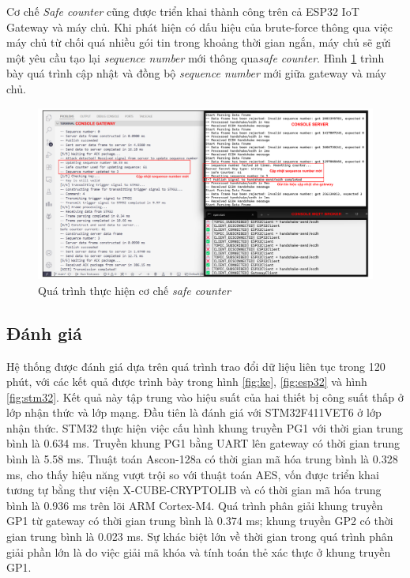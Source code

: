 Cơ chế \textit{Safe counter} cũng được triển khai thành công trên cả ESP32 IoT Gateway và máy chủ. Khi phát hiện có dấu hiệu của brute-force thông qua việc máy chủ từ chối quá nhiều gói tin trong khoảng thời gian ngắn, máy chủ sẽ gửi một yêu cầu tạo lại \textit{sequence number} mới thông qua\textit{safe counter}. Hình \ref{fig:sclog} trình bày quá trình cập nhật và đồng bộ \textit{sequence number} mới giữa gateway và máy chủ.

\begin{figure}[h]
    \centering
    \hspace*{-0.7cm}
    \includegraphics[width=1.08\linewidth]{sclog.pdf}
    \caption{Quá trình thực hiện cơ chế \textit{safe counter}}
    \label{fig:sclog}
\end{figure}

\subsection{Đánh giá}
\label{sec:res}
Hệ thống được đánh giá dựa trên quá trình trao đổi dữ liệu liên tục trong 120 phút, với các kết quả được trình bày trong hình \ref{fig:ke}, \ref{fig:esp32} và hình \ref{fig:stm32}. Kết quả này tập trung vào hiệu suất của hai thiết bị công suất thấp ở lớp nhận thức và lớp mạng. Đầu tiên là đánh giá với STM32F411VET6 ở lớp nhận thức. STM32 thực hiện việc cấu hình khung truyền PG1 với thời gian trung bình là 0.634 ms. Truyền khung PG1 bằng UART lên gateway có thời gian trung bình là 5.58 ms. Thuật toán Ascon-128a có thời gian mã hóa trung bình là 0.328 ms, cho thấy hiệu năng vượt trội so với thuật toán AES, vốn được triển khai tương tự bằng thư viện X-CUBE-CRYPTOLIB và có thời gian mã hóa trung bình là 0.936 ms trên lõi ARM Cortex-M4. Quá trình phân giải khung truyền GP1 từ gateway có thời gian trung bình là 0.374 ms; khung truyền GP2 có thời gian trung bình là 0.023 ms. Sự khác biệt lớn về thời gian trong quá trình phân giải phần lớn là do việc giải mã khóa và tính toán thẻ xác thực ở khung truyền GP1.

